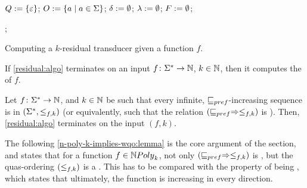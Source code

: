 \begin{algorithm}
    $Q \mathrel{:=} \{ \varepsilon \}$;
    $O \mathrel{:=} \mathopen{\{}  a  \mid  a \in \Sigma \mathclose{\}}$;
    $\delta \mathrel{:=} \emptyset$;
    $\lambda \mathrel{:=} \emptyset$;
    $F \mathrel{:=} \emptyset$;

    ;
    \caption{Computing a $k$-residual transducer given a function $f$.}
    \label{residual:algo}
\end{algorithm}

\begin{lemma}
    \label{correct-residual:lemma}
    If \cref{residual:algo} terminates on 
    an input $f \colon \Sigma^* \to \mathbb{N}$, $k \in \mathbb{N}$,
    then it computes the  of $f$.
\end{lemma}



\begin{lemma}
    \label{wqo-implies-termination:lemma}
    Let $f \colon \Sigma^* \to \mathbb{N}$, and $k \in \mathbb{N}$ be such that
    every infinite, $\prefleq$-increasing sequence is 
    in $(\Sigma^*, \mathrel{\leq_{{f},{k}}})$
    (or equivalently, such that the relation $(\prefleq \Rightarrow \resleq{f}{k})$
    is ).
    Then, \cref{residual:algo} terminates on the input $(f,k)$.
\end{lemma}

The following \cref{n-poly-k-implies-wqo:lemma} is the core argument of the
section, and states that for a function $f \in \NPoly[k]$, not only $(\prefleq
\Rightarrow \resleq{f}{k})$ is , but the quas-ordering $(\mathrel{\leq_{{f},{k}}})$ is a
. This has to be compared with the property of being
, which states that ultimately, the function is
increasing in every direction.

